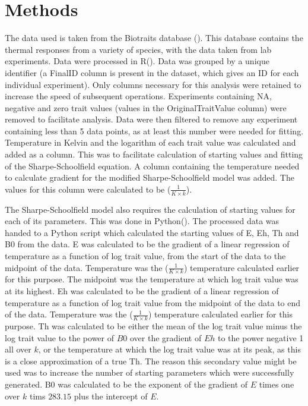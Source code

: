 \documentclass[11pt]{article}
\begin{document}
\section{Methods}
The data used is taken from the Biotraits database (\cite{Dell2011}). This database contains the thermal responses from a variety of species, with the data taken from lab experiments.
Data were processed in R(\cite{R2019}). Data was grouped by a unique identifier (a FinalID column is present in the dataset, which gives an ID for each individual experiment). Only columns necessary for this analysis were retained to increase the speed of subsequent operations. Experiments containing NA, negative and zero trait values (values in the OriginalTraitValue column) were removed to facilitate analysis. Data were then filtered to remove any experiment containing less than 5 data points, as at least this number were needed for fitting.  
Temperature in Kelvin and the logarithm of each trait value was calculated and added as a column. This was to facilitate calculation of starting values and fitting of the Sharpe-Schoolfield equation. 
A column containing the temperature needed to calculate gradient for the modified Sharpe-Schoolfield model was added. The values for this column were calculated to be ($\frac{ 1}{K \times k}$).

The Sharpe-Schoolfield model also requires the calculation of starting values for each of its parameters. This was done in Python(\cite{Python32019}). The processed data was handed to a Python script which calculated the starting values of E, Eh, Th and B0 from the data. 
E was calculated to be the gradient of a linear regression of temperature as a function of log trait value, from the start of the data to the midpoint of the data. Temperature was the ($\frac{ 1}{K \times k}$) temperature calculated earlier for this purpose. The midpoint was the temperature at which log trait value was at its highest.
Eh was calculated to be the gradient of a linear regression of temperature as a function of log trait value from the midpoint of the data to end of the data. Temperature was the ($\frac{ 1}{K \times k}$) temperature calculated earlier for this purpose. 
Th was calculated to be either the mean of the log trait value minus the log trait value to the power of $B0$ over the gradient of $Eh$ to the power negative 1 all over $k$, 
or the temperature at which the log trait value was at its peak, as this is a close approximation of a true Th. The reason this secondary value might be used was to increase the number of starting parameters which were successfully generated. 
B0 was calculated to be the exponent of the gradient of $E$ times one over $k$ tims $283.15$ plus the intercept of $E$. 
\end{document}
